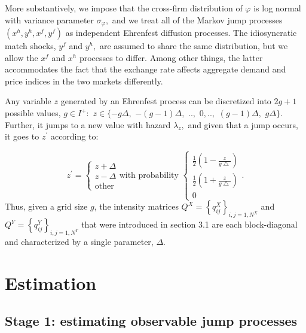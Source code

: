 \documentclass[12pt]{article}
\begin{document}
More substantively, we impose that the cross-firm distribution of $\varphi $
is log normal with variance parameter $\sigma _{\varphi },$ and we treat all
of the Markov jump processes $(x^{h},y^{h},x^{f},y^{f})$ as independent
Ehrenfest diffusion processes. The idiosyncratic match shocks, $y^{f}$ and $%
y^{h},$ are assumed to share the same distribution, but we allow the $x^{f}$
and $x^{h}$ processes to differ. Among other things, the latter accommodates
the fact that the exchange rate affects aggregate demand and price indices
in the two markets differently.

Any variable $z$ generated by an Ehrenfest process can be discretized into $%
2g+1$ possible values, $g\in I^{+}:$ $z\in \{-g\Delta ,$ $-(g-1)\Delta ,$ $%
..,$ $0,..,$ $(g-1)\Delta ,$ $g\Delta \}.$ Further, it jumps to a new value
with hazard $\lambda _{z},$ and given that a jump occurs, it goes to $%
z^{\prime }$ according to:

\begin{equation*}
z^{\prime }=\left\{ 
\begin{array}{c}
z+\Delta \\ 
z-\Delta \\ 
\text{other}%
\end{array}%
\right. \text{with probability }\left\{ 
\begin{array}{c}
\frac{1}{2}\left( 1-\frac{z}{g\bigtriangleup }\right) \\ 
\frac{1}{2}\left( 1+\frac{z}{g\bigtriangleup }\right) \\ 
0%
\end{array}%
\right. .
\end{equation*}%
Thus, given a grid size $g$, the intensity matrices $Q^{X}=\left\{
q_{ij}^{X}\right\} _{i,j=1,N^{X}}$ and $Q^{Y}=\left\{ q_{ij}^{Y}\right\}
_{i,j=1,N^{Y}}$ that were introduced in section 3.1 are each block-diagonal
and characterized by a single parameter, $\Delta $.

\section{Estimation}

\subsection{Stage 1: estimating observable jump processes}
\end{document}
